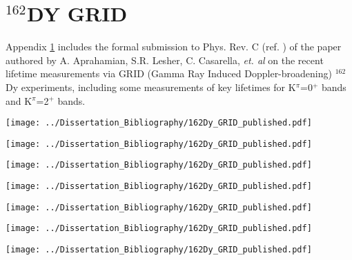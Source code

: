 \chapter{$^{162}$DY GRID}\label{appendix:162Dy_GRID}

Appendix \ref{appendix:162Dy_GRID} includes the formal submission to Phys. Rev. C (ref. \cite{Aprahamian_162Dy_GRID}) of the paper authored by A. Aprahamian, S.R. Lesher, C. Casarella, \textit{et. al} on the recent lifetime measurements via GRID (Gamma Ray Induced Doppler-broadening) $^{162}$Dy experiments, including some measurements of key lifetimes for K$^\pi$=0$^+$ bands and K$^\pi$=2$^+$ bands.
\newpage

\begin{center}
\texttt{[image: ../Dissertation\_Bibliography/162Dy\_GRID\_published.pdf]}
\end{center}

\begin{center}
\texttt{[image: ../Dissertation\_Bibliography/162Dy\_GRID\_published.pdf]}
\end{center}

\begin{center}
\texttt{[image: ../Dissertation\_Bibliography/162Dy\_GRID\_published.pdf]}
\end{center}

\begin{center}
\texttt{[image: ../Dissertation\_Bibliography/162Dy\_GRID\_published.pdf]}
\end{center}

\begin{center}
\texttt{[image: ../Dissertation\_Bibliography/162Dy\_GRID\_published.pdf]}
\end{center}

\begin{center}
\texttt{[image: ../Dissertation\_Bibliography/162Dy\_GRID\_published.pdf]}
\end{center}

\begin{center}
\texttt{[image: ../Dissertation\_Bibliography/162Dy\_GRID\_published.pdf]}
\end{center}

